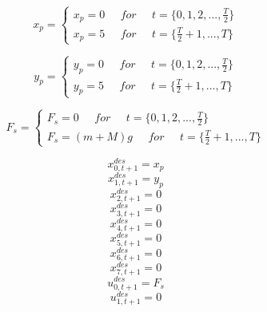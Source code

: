 \documentclass[a4paper,11pt,oneside]{book}
\begin{document}
$$ x_{p}=\left\{
\begin{aligned}
x_{p}=0  \;\;\;\;\;for\;\;\;\;\;   t = \{0, 1, 2, ..., \frac{T}{2}\}\\
x_{p}=5   \;\;\;\;\;for\;\;\;\;\;   t = \{\frac{T}{2}+1, ..., T\}
\end{aligned}
\right.
$$

$$ y_{p}=\left\{
\begin{aligned}
y_{p}=0  \;\;\;\;\;for\;\;\;\;\;   t = \{0, 1, 2, ..., \frac{T}{2}\}\\
y_{p}=5   \;\;\;\;\;for\;\;\;\;\;   t = \{\frac{T}{2}+1, ..., T\}
\end{aligned}
\right.
$$

$$ F_{s}=\left\{
\begin{aligned}
F_{s}=0  \;\;\;\;\;for\;\;\;\;\;   t = \{0, 1, 2, ..., \frac{T}{2}\}\\
F_{s}=(m+M)g   \;\;\;\;\;for\;\;\;\;\;   t = \{\frac{T}{2}+1, ..., T\}
\end{aligned}
\right.
$$

\begin{equation}
    x^{des}_{0,t+1}=x_{p}
\end{equation}
\begin{equation}
    x^{des}_{1,t+1}=y_{p}
\end{equation}
\begin{equation}
    x^{des}_{2,t+1}=0
\end{equation}
\begin{equation}
    x^{des}_{3,t+1}=0
\end{equation}
\begin{equation}
    x^{des}_{4,t+1}=0
\end{equation}
\begin{equation}
    x^{des}_{5,t+1}=0
\end{equation}
\begin{equation}
    x^{des}_{6,t+1}=0
\end{equation}
\begin{equation}
    x^{des}_{7,t+1}=0
\end{equation}
\begin{equation}
    u^{des}_{0,t+1}=F_{s}
\end{equation}
\begin{equation}
    u^{des}_{1,t+1}=0
\end{equation}
\end{document}
